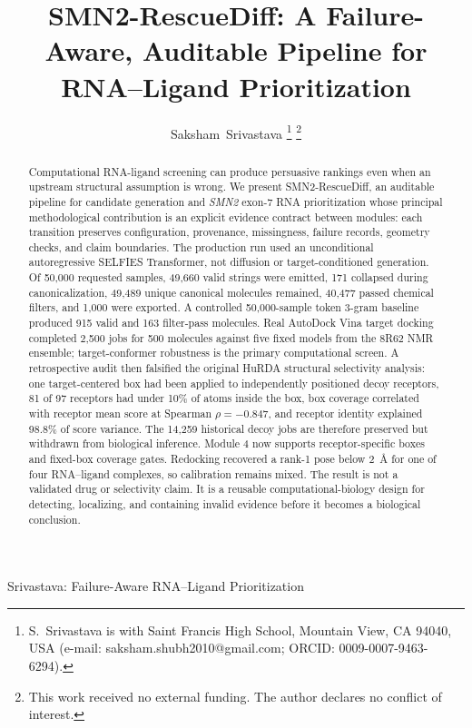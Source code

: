 \documentclass[journal]{IEEEtran}
\begin{document}
\title{SMN2-RescueDiff: A Failure-Aware, Auditable Pipeline for RNA--Ligand Prioritization}

\author{Saksham~Srivastava%
\thanks{S.~Srivastava is with Saint Francis High School, Mountain View,
CA 94040, USA (e-mail: saksham.shubh2010@gmail.com; ORCID:
0009-0007-9463-6294).}%
\thanks{This work received no external funding. The author declares no
conflict of interest.}}

%
{Srivastava: Failure-Aware RNA--Ligand Prioritization}

\maketitle

\begin{abstract}
Computational RNA-ligand screening can produce persuasive rankings even
when an upstream structural assumption is wrong. We present
SMN2-RescueDiff, an auditable pipeline for candidate generation and
\textit{SMN2} exon-7 RNA prioritization whose principal methodological
contribution is an explicit evidence contract between modules: each
transition preserves configuration, provenance, missingness, failure
records, geometry checks, and claim boundaries. The production run used
an unconditional autoregressive SELFIES Transformer, not diffusion or
target-conditioned generation. Of 50,000 requested samples, 49,660
valid strings were emitted, 171 collapsed during canonicalization,
49,489 unique canonical molecules remained, 40,477 passed chemical
filters, and 1,000 were exported. A controlled 50,000-sample token
3-gram baseline produced 915 valid and 163 filter-pass molecules. Real
AutoDock Vina target docking completed 2,500 jobs for 500 molecules
against five fixed models from the 8R62 NMR ensemble; target-conformer
robustness is the primary computational screen. A retrospective audit
then falsified the original HuRDA structural selectivity analysis: one
target-centered box had been applied to independently positioned decoy
receptors, 81 of 97 receptors had under 10\% of atoms inside the box,
box coverage correlated with receptor mean score at Spearman
$\rho=-0.847$, and receptor identity explained 98.8\% of score variance.
The 14,259 historical decoy jobs are therefore preserved but withdrawn
from biological inference. Module 4 now supports receptor-specific boxes
and fixed-box coverage gates. Redocking recovered a rank-1 pose below
2~\AA{} for one of four RNA--ligand complexes, so calibration remains
mixed. The result is not a validated drug or selectivity claim. It is a
reusable computational-biology design for detecting, localizing, and
containing invalid evidence before it becomes a biological conclusion.
\end{abstract}
\end{document}
